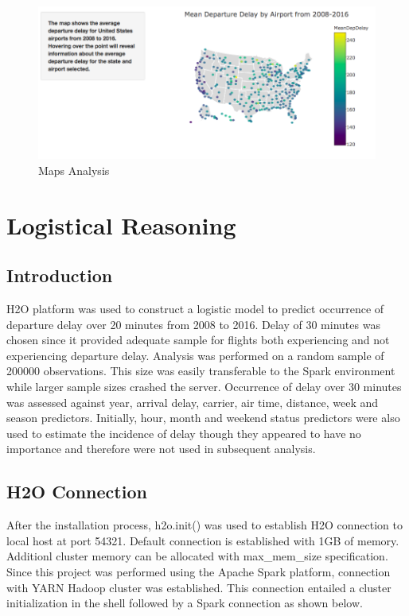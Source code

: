 \documentclass[12pt,twoside]{amherstthesis}
\begin{document}
  \begin{figure}[htbp]
  \centering
  \includegraphics[scale = 0.5,angle = 0]{figure/Shiny5.png}
  \caption[Maps Analysis]{\normalsize{Maps Analysis}}
  \label{fig:shiny5}
  \end{figure}
  
  \clearpage
  
  \chapter{Logistical Reasoning}\label{logistical-reasoning}
  
  \section{Introduction}\label{introduction-2}
  
  H2O platform was used to construct a logistic model to predict
  occurrence of departure delay over 20 minutes from 2008 to 2016. Delay
  of 30 minutes was chosen since it provided adequate sample for flights
  both experiencing and not experiencing departure delay. Analysis was
  performed on a random sample of 200000 observations. This size was
  easily transferable to the Spark environment while larger sample sizes
  crashed the server. Occurrence of delay over 30 minutes was assessed
  against year, arrival delay, carrier, air time, distance, week and
  season predictors. Initially, hour, month and weekend status predictors
  were also used to estimate the incidence of delay though they appeared
  to have no importance and therefore were not used in subsequent
  analysis.
  
  \section{H2O Connection}\label{h2o-connection}
  
  After the installation process, h2o.init() was used to establish H2O
  connection to local host at port 54321. Default connection is
  established with 1GB of memory. Additionl cluster memory can be
  allocated with max\_mem\_size specification. Since this project was
  performed using the Apache Spark platform, connection with YARN Hadoop
  cluster was established. This connection entailed a cluster
  initialization in the shell followed by a Spark connection as shown
  below.
  
\end{document}
